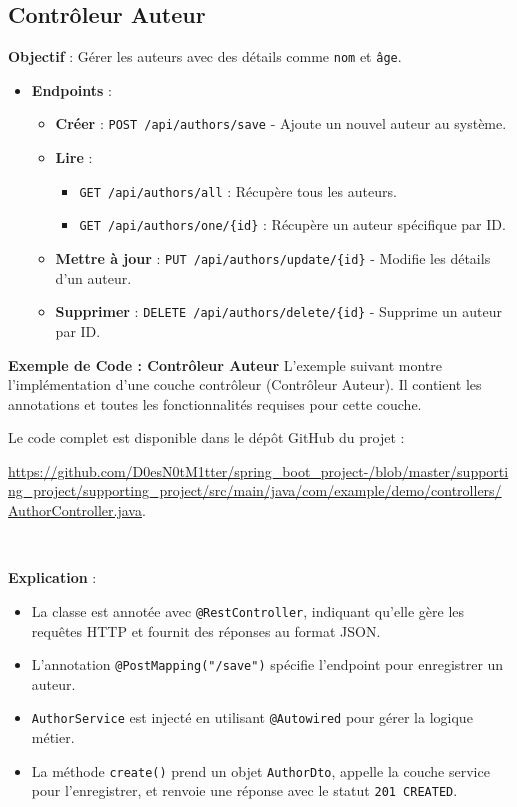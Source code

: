 \documentclass[a4paper,12pt]{article}
\begin{document}
\subsection{Contrôleur Auteur}
\textbf{Objectif} : Gérer les auteurs avec des détails comme \texttt{nom} et \texttt{âge}.
\begin{itemize}
    \item \textbf{Endpoints} :
    \begin{itemize}
        \item \textbf{Créer} : \texttt{POST /api/authors/save} - Ajoute un nouvel auteur au système.
        \item \textbf{Lire} :
        \begin{itemize}
            \item \texttt{GET /api/authors/all} : Récupère tous les auteurs.
            \item \texttt{GET /api/authors/one/\{id\}} : Récupère un auteur spécifique par ID.
        \end{itemize}
        \item \textbf{Mettre à jour} : \texttt{PUT /api/authors/update/\{id\}} - Modifie les détails d'un auteur.
        \item \textbf{Supprimer} : \texttt{DELETE /api/authors/delete/\{id\}} - Supprime un auteur par ID.
    \end{itemize}
\end{itemize}

\textbf{Exemple de Code : Contrôleur Auteur}
L'exemple suivant montre l'implémentation d'une couche contrôleur (Contrôleur Auteur).
Il contient les annotations et toutes les fonctionnalités requises pour cette couche.

Le code complet est disponible dans le dépôt GitHub du projet : 
\hspace{5}\
\vspace{0.1cm}\

\url{https://github.com/D0esN0tM1tter/spring_boot_project-/blob/master/supporting_project/supporting_project/src/main/java/com/example/demo/controllers/AuthorController.java}.

\vspace{0.5cm}\

\textbf{Explication} :
\begin{itemize}
    \item La classe est annotée avec \texttt{@RestController}, indiquant qu'elle gère les requêtes HTTP et fournit des réponses au format JSON.
    \item L'annotation \texttt{@PostMapping("/save")} spécifie l'endpoint pour enregistrer un auteur.
    \item \texttt{AuthorService} est injecté en utilisant \texttt{@Autowired} pour gérer la logique métier.
    \item La méthode \texttt{create()} prend un objet \texttt{AuthorDto}, appelle la couche service pour l'enregistrer, et renvoie une réponse avec le statut \texttt{201 CREATED}.
\end{itemize}
\end{document}
